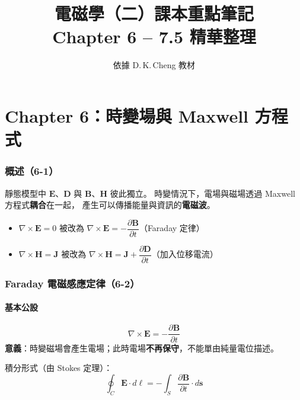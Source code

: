\documentclass[12pt,a4paper]{article}
\title{\Huge\bfseries 電磁學（二）課本重點筆記\\[6pt]
\Large Chapter 6 -- 7.5 精華整理}
\author{依據 D.\,K.\,Cheng 教材}
\date{}
\newcommand{\vE}{\mathbf{E}}
\newcommand{\vB}{\mathbf{B}}
\newcommand{\vH}{\mathbf{H}}
\newcommand{\vJ}{\mathbf{J}}
\newcommand{\vD}{\mathbf{D}}
\begin{document}
\maketitle
\tableofcontents
\newpage

\part{Chapter 6：時變場與 Maxwell 方程式}

\section{概述（6-1）}

靜態模型中 $\vE$、$\vD$ 與 $\vB$、$\vH$ 彼此獨立。
時變情況下，電場與磁場透過 Maxwell 方程式\textbf{耦合}在一起，
產生可以傳播能量與資訊的\textbf{電磁波}。

\begin{notebox}[靜態 → 時變的關鍵改變]
\begin{itemize}[nosep]
  \item $\nabla\times\vE = 0$ 被改為 $\nabla\times\vE = -\dfrac{\partial\vB}{\partial t}$（Faraday 定律）
  \item $\nabla\times\vH = \vJ$ 被改為 $\nabla\times\vH = \vJ + \dfrac{\partial\vD}{\partial t}$（加入位移電流）
\end{itemize}
\end{notebox}

\section{Faraday 電磁感應定律（6-2）}

\subsection{基本公設}

\begin{keybox}
\[
\boxed{\nabla\times\vE = -\frac{\partial\vB}{\partial t}}
\]
\textbf{意義}：時變磁場會產生電場；此時電場\textbf{不再保守}，不能單由純量電位描述。
\end{keybox}

積分形式（由 Stokes 定理）：
\[
\oint_C \vE\cdot d\boldsymbol{\ell} = -\int_S \frac{\partial\vB}{\partial t}\cdot d\mathbf{s}
\]
\end{document}
